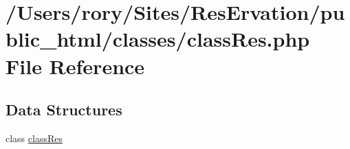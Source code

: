 \hypertarget{class_res_8php}{}\section{/\+Users/rory/\+Sites/\+Res\+Ervation/public\+\_\+html/classes/class\+Res.php File Reference}
\label{class_res_8php}
\subsection*{Data Structures}
\begin{DoxyCompactItemize}
\item 
class \hyperlink{classclass_res}{class\+Res}
\end{DoxyCompactItemize}
